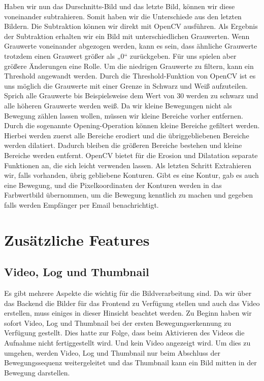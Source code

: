 Haben wir nun das Durschnitts-Bild und das letzte Bild, können wir diese voneinander subtrahieren. Somit haben wir die Unterschiede aus den letzten Bildern. Die Subtraktion können wir direkt mit OpenCV ausführen.
Als Ergebnis der Subtraktion erhalten wir ein Bild mit unterschiedlichen Grauwerten. Wenn Grauwerte voneinander abgezogen werden, kann es sein, dass ähnliche Grauwerte trotzdem einen Grauwert größer als „0“ zurückgeben. Für uns spielen aber größere Änderungen eine Rolle. Um die niedrigen Grauwerte zu filtern, kann ein Threshold angewandt werden. Durch die Threshold-Funktion von OpenCV ist es uns möglich die Grauwerte mit einer Grenze in Schwarz und Weiß aufzuteilen.  Sprich alle Grauwerte  bis Beispielsweise dem Wert von 30 werden zu schwarz und alle höheren Grauwerte werden weiß.
Da wir kleine Bewegungen nicht als Bewegung zählen lassen wollen, müssen wir kleine Bereiche vorher entfernen. Durch die sogenannte Opening-Operation können kleine Bereiche gefiltert werden. Hierbei werden zuerst alle Bereiche erodiert und die übriggebliebenen Bereiche werden dilatiert. Dadurch bleiben die größeren Bereiche bestehen und kleine Bereiche werden entfernt. OpenCV bietet für die Erosion und Dilatation separate Funktionen an, die sich leicht verwenden lassen.
Als letzten Schritt Extrahieren wir, falls vorhanden, übrig gebliebene Konturen. Gibt es eine Kontur, gab es auch eine Bewegung, und die Pixelkoordinaten der Konturen werden in das Farbwertbild übernommen, um die Bewegung kenntlich zu machen und gegeben falls werden Empfänger per Email benachrichtigt.
\section{Zusätzliche Features}
\subsection{Video, Log und Thumbnail}
Es gibt mehrere Aspekte die wichtig für die Bildverarbeitung sind. Da wir über das Backend die Bilder für das Frontend zu Verfügung stellen und auch das Video erstellen, muss einiges in dieser Hinsicht beachtet werden. Zu Beginn haben wir sofort Video, Log und Thumbnail bei der ersten Bewegungserkennung zu Verfügung gestellt. Dies hatte zur Folge, dass beim Aktivieren des Videos die Aufnahme nicht fertiggestellt wird. Und kein Video angezeigt wird. Um dies zu umgehen, werden Video, Log und Thumbnail nur beim Abschluss der Bewegungssequenz weitergeleitet und das Thumbnail kann ein Bild mitten in der Bewegung darstellen.
